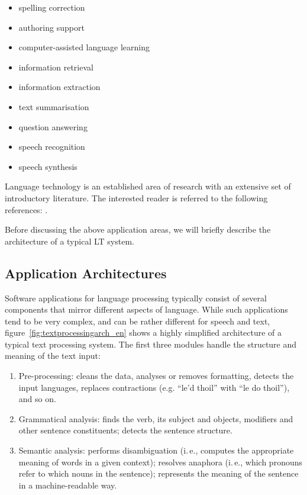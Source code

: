 \begin{multicols}{2}
\begin{itemize}
\item spelling correction
\item authoring support
\item computer-assisted language learning
\item information retrieval 
\item information extraction
\item text summarisation
\item question answering
\item speech recognition 
\item speech synthesis 
\end{itemize}

Language technology is an established area of research with an extensive set of introductory literature. The interested reader is referred to the following references:  \cite{carstensen-etal1, jurafsky-martin01, manning-schuetze1, lt-world1, lt-survey1}. 

Before discussing the above application areas, we will briefly describe the architecture of a typical LT system.

\subsection{Application Architectures}

Software applications for language processing typically consist of several components that mirror different aspects of language. While such applications tend to be very complex, and can be rather different for speech and text, figure~\ref{fig:textprocessingarch_en} shows a highly simplified architecture of a typical text processing system. The first three modules handle the structure and meaning of the text input:

\begin{enumerate}
\item Pre-processing: cleans the data, analyses or removes formatting, detects the input languages, replaces contractions (e.g. ``le’d thoil'' with ``le do thoil''), and so on.
\item Grammatical analysis: finds the verb, its subject and objects, modifiers and other sentence constituents; detects the sentence structure.
\item Semantic analysis: performs disambiguation (i.\,e., computes the appropriate meaning of words in a given context); resolves anaphora (i.\,e., which pronouns refer to which nouns in the sentence); represents the meaning of the sentence in a machine-readable way.
\end{enumerate}


\end{multicols}
